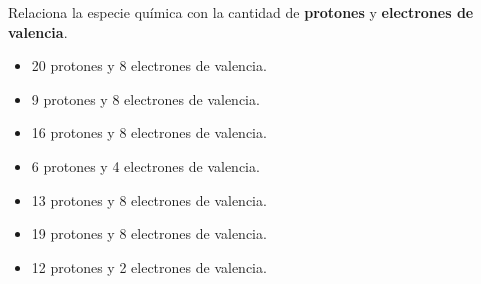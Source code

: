 \question Relaciona la especie química con la cantidad de \textbf{protones} y \textbf{electrones de valencia}.\\

\begin{minipage}{0.5\textwidth}
\end{minipage}%
\begin{minipage}{0.5\textwidth}
    \begin{itemize}
        \item[\rule{1cm}{0.2mm}] 20 protones y 8 electrones de valencia.
        \item[\rule{1cm}{0.2mm}] 9 protones y 8 electrones de valencia.
        \item[\rule{1cm}{0.2mm}] 16 protones y 8 electrones de valencia.
        \item[\rule{1cm}{0.2mm}] 6 protones y 4 electrones de valencia.
        \item[\rule{1cm}{0.2mm}] 13 protones y 8 electrones de valencia.
        \item[\rule{1cm}{0.2mm}] 19 protones y 8 electrones de valencia.
        \item[\rule{1cm}{0.2mm}] 12 protones y 2 electrones de valencia.
    \end{itemize}
\end{minipage}

